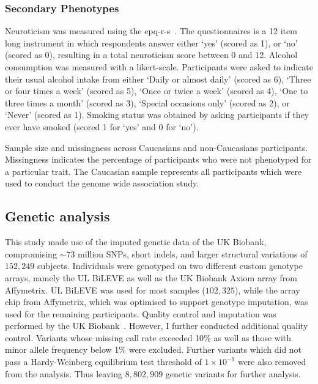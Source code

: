 \subsubsection{Secondary Phenotypes}
\label{ssub:sec_pheno}

Neuroticism was measured using the \acrfull{epq-r-s}~\cite{Eysenck1985}. 
The questionnaires is a 12 item long instrument in which respondents answer either `yes' (scored as 1), or `no' (scored as 0),
resulting in a total neuroticism score between 0 and 12.
Alcohol consumption was measured with a likert-scale.
Participants were asked to indicate their usual alcohol intake from either `Daily or almost daily' (scored as 6), `Three or four times a week' (scored as 5), `Once or twice a week' (scored as 4), `One to three times a month' (scored as 3), `Special occasions only' (scored as 2), or `Never' (scored as 1).
Smoking status was obtained by asking participants if they ever have smoked (scored 1 for `yes' and 0 for `no').


\begin{table}[!htpb]
	\centering
	\resizebox{\textwidth}{!}{}
  \caption[Sample Size and Missingness of UK Biobank]{
    Sample size and missingness across Caucasians and non-Caucasians participants.
    Missingness indicates the percentage of participants who were not phenotyped for a particular trait.
    The Caucasian sample represents all participants which were used to conduct the genome wide association study.
}\label{tab:descriptive_gwas} 
\end{table}

\subsection{Genetic analysis}
\label{sub:genetic_analysis_assoc}
This study made use of the imputed genetic data of the UK Biobank, compromising $\sim73$ million SNPs, short indels, and larger structural variations of $152,249$ subjects.
Individuals were genotyped on two different custom genotype arrays, namely the UL BiLEVE as well as the UK Biobank Axiom array from Affymetrix. 
UL BiLEVE was used for most samples ($102,325$), while the array chip from Affymetrix, which was optimised to support genotype imputation, was used for the remaining participants. 
Quality control and imputation was performed by the UK Biobank~\cite{Marchini2015}.
However, I further conducted additional quality control.
Variants whose missing call rate exceeded 10\% as well as those with minor allele frequency below 1\% were excluded.
Further variants which did not pass a Hardy-Weinberg equilibrium test threshold of $1\times10^{-9}$ were also removed from the analysis.
Thus leaving $8,802,909$ genetic variants for further analysis.

